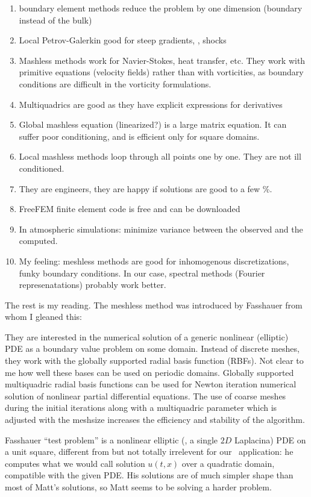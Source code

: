 \begin{description}
{{\begin{enumerate}
  \item
boundary element methods reduce the problem by one dimension (boundary
instead of the bulk)
  \item
Local Petrov-Galerkin good for steep gradients, \ie, shocks
  \item
Mashless methods work for Navier-Stokes, heat transfer, etc. They work
with primitive equations (velocity fields) rather than with vorticities,
as boundary conditions are difficult in the vorticity formulations.
  \item
Multiquadrics are good as they have explicit expressions for derivatives
  \item
Global mashless equation (linearized?) is a large matrix equation.
It can suffer poor conditioning, and is
efficient only for square domains.
  \item
Local mashless methods loop through all points one by one. They are
not ill conditioned.
  \item
They are engineers, they are happy if solutions are good to a few \%.
  \item
FreeFEM finite element code is free and can be downloaded
  \item
In atmospheric simulations: minimize variance between the observed and
the computed.
  \item
My feeling: meshless methods are good for inhomogenous discretizations, funky
boundary conditions. In our case, spectral methods (Fourier represenatations)
probably work better.
\end{enumerate}

The rest is my reading.
The meshless method was introduced by Fasshauer from whom
I gleaned this:

    They are interested in the numerical solution of a generic nonlinear
    (elliptic) PDE as a boundary value problem on some domain. Instead of
    discrete meshes, they work with the globally supported radial basis
    function (RBFs). Not clear to me how well these bases can be used on
    periodic domains. Globally supported multiquadric radial basis
    functions can be used for Newton iteration numerical solution of
    nonlinear partial differential equations. The use of coarse meshes
    during the initial iterations along with a multiquadric parameter
    which is adjusted with the meshsize increases the efficiency and
    stability of the algorithm.

    Fasshauer ``test problem'' is a nonlinear elliptic
    (\ie, a single $2D$ Laplacina) PDE on a unit square, different from
    but not totally irrelevent for our \KS\ application: he computes what
    we would call solution $u(t,x)$ over a quadratic domain, compatible
    with the given PDE. His solutions are of much simpler shape than most
    of Matt's solutions, so Matt seems to be solving a harder problem.

}}
\end{description}
